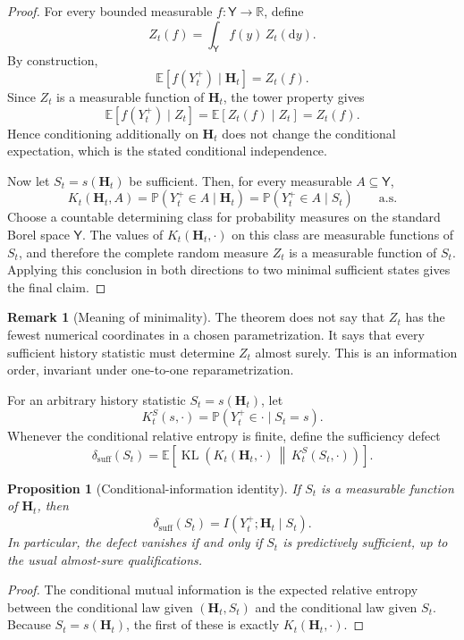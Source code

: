 \documentclass[11pt,letterpaper]{article}
\DeclareMathOperator{\KL}{KL}
\theoremstyle{plain}
\newtheorem{proposition}[theorem]{Proposition}
\theoremstyle{definition}
\newtheorem{remark}[theorem]{Remark}
\begin{document}
\begin{proof}
For every bounded measurable \(f:\mathsf Y\to\mathbb R\), define
\[
Z_t(f)=\int_{\mathsf Y}f(y)\,Z_t(\mathrm dy).
\]
By construction,
\[
\mathbb E[f(Y_t^+)\mid\mathbf H_t]=Z_t(f).
\]
Since \(Z_t\) is a measurable function of \(\mathbf H_t\), the tower property
gives
\[
\mathbb E[f(Y_t^+)\mid Z_t]
=
\mathbb E[Z_t(f)\mid Z_t]
=
Z_t(f).
\]
Hence conditioning additionally on \(\mathbf H_t\) does not change the
conditional expectation, which is the stated conditional independence.

Now let \(S_t=s(\mathbf H_t)\) be sufficient. Then, for every measurable
\(A\subseteq\mathsf Y\),
\[
K_t(\mathbf H_t,A)
=
\mathbb P(Y_t^+\in A\mid\mathbf H_t)
=
\mathbb P(Y_t^+\in A\mid S_t)
\qquad\text{a.s.}
\]
Choose a countable determining class for probability measures on the standard
Borel space \(\mathsf Y\). The values of \(K_t(\mathbf H_t,\cdot)\) on this
class are measurable functions of \(S_t\), and therefore the complete random
measure \(Z_t\) is a measurable function of \(S_t\). Applying this conclusion
in both directions to two minimal sufficient states gives the final claim.
\end{proof}

\begin{remark}[Meaning of minimality]
The theorem does not say that \(Z_t\) has the fewest numerical coordinates in
a chosen parametrization. It says that every sufficient history statistic
must determine \(Z_t\) almost surely. This is an information order, invariant
under one-to-one reparametrization.
\end{remark}

For an arbitrary history statistic \(S_t=s(\mathbf H_t)\), let
\[
K_t^{S}(s,\cdot)
=
\mathbb P(Y_t^+\in\cdot\mid S_t=s).
\]
Whenever the conditional relative entropy is finite, define the sufficiency
defect
\[
\boxed{
\delta_{\mathrm{suff}}(S_t)
=
\mathbb E\!\left[
\KL\!\left(
K_t(\mathbf H_t,\cdot)
\,\middle\|\,
K_t^S(S_t,\cdot)
\right)
\right].
}
\]

\begin{proposition}[Conditional-information identity]\label{prop:conditional-information}
If \(S_t\) is a measurable function of \(\mathbf H_t\), then
\[
\boxed{
\delta_{\mathrm{suff}}(S_t)
=
I(Y_t^+;\mathbf H_t\mid S_t).
}
\]
In particular, the defect vanishes if and only if \(S_t\) is predictively
sufficient, up to the usual almost-sure qualifications.
\end{proposition}

\begin{proof}
The conditional mutual information is the expected relative entropy between
the conditional law given \((\mathbf H_t,S_t)\) and the conditional law given
\(S_t\). Because \(S_t=s(\mathbf H_t)\), the first of these is exactly
\(K_t(\mathbf H_t,\cdot)\).
\end{proof}
\end{document}
